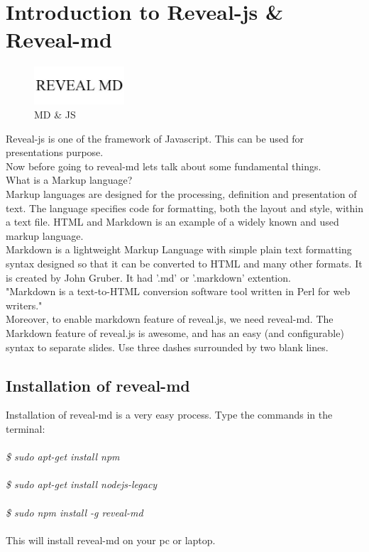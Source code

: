 \section{Introduction to Reveal-js \& Reveal-md}
\begin{figure}[!ht]
\centering
\includegraphics[width=0.3\textwidth]{input/images/reveal.png}                   
\caption{MD \& JS}
\hspace{-1.5em}
\end{figure}
Reveal-js is one of the framework of Javascript. This can be used for presentations purpose.\\
Now before going to reveal-md lets talk about some fundamental things.\\
What is a Markup language?\\
Markup languages are designed for the processing, definition and presentation of text. The language specifies code for formatting, both the layout and style, within a text file. HTML and Markdown  is an example of a widely known and used markup language.\\
Markdown is a lightweight Markup Language with simple plain text formatting syntax designed so that it can be converted to HTML and many other formats. It is created by  John Gruber. It had '.md' or '.markdown' extention.\\
"Markdown is a text-to-HTML conversion software tool written in Perl for web writers."\\
Moreover, to enable markdown feature of reveal.js, we need reveal-md. The Markdown feature of reveal.js is awesome, and has an easy (and configurable) syntax to separate slides. Use three dashes surrounded by two blank lines.\\
\subsection{Installation of reveal-md}
Installation of reveal-md is a very easy process.
Type the commands in the terminal:\\\\
\emph{
\$ sudo apt-get install npm\\\\
\$ sudo apt-get install nodejs-legacy\\\\
\$ sudo npm install -g reveal-md\\\\}
This will install reveal-md on your pc or laptop.


